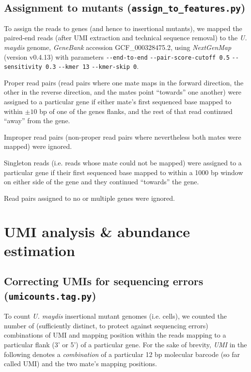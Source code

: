 \documentclass[a4paper,11pt,oneside]{amsart}
\begin{document}
\subsection*{Assignment to mutants (\texttt{assign\_to\_features.py})}

To assign the reads to genes (and hence to insertional mutants), we mapped the paired-end reads (after UMI extraction and technical sequence removal) to the \textit{U. maydis} genome, \textit{GeneBank} accession GCF\_000328475.2\cite{Kamper2006}, using \textit{NextGenMap}\cite{Sedlazeck2013} (version v0.4.13) with parameters 
\texttt{-{}-end-\allowbreak to-\allowbreak end} \texttt{-{}-pair-\allowbreak score-\allowbreak cutoff 0.5} \texttt{-{}-sensitivity 0.3} \texttt{-{}-kmer 13} \texttt{-{}-kmer-\allowbreak skip 0}.

Proper read pairs (read pairs where one mate maps in the forward direction, the other in the reverse direction, and the mates point ``towards'' one another) were assigned to a particular gene if either mate's first sequenced base mapped to within $\pm 10$ bp of one of the genes flanks, and the rest of that read continued ``away'' from the gene.

Improper read pairs (non-proper read pairs where nevertheless both mates were mapped) were ignored.

Singleton reads (i.e. reads whose mate could not be mapped) were assigned to a particular gene if their first sequenced base mapped to within a 1000 bp window on either side of the gene and they continued ``towards'' the gene.

Read pairs assigned to no or multiple genes were ignored.

\section{UMI analysis \& abundance estimation}

\subsection*{Correcting UMIs for sequencing errors (\texttt{umicounts.tag.py})}

To count \textit{U. maydis} insertional mutant genomes (i.e. cells), we counted the number of (sufficiently distinct, to protect against sequencing errors) combinations of UMI and mapping position within the reads mapping to a particular flank (3' or 5') of a particular gene. For the sake of brevity, \textit{UMI} in the following denotes a \emph{combination} of a particular 12 bp molecular barcode (so far called UMI) and the two mate's mapping positions.
\end{document}
